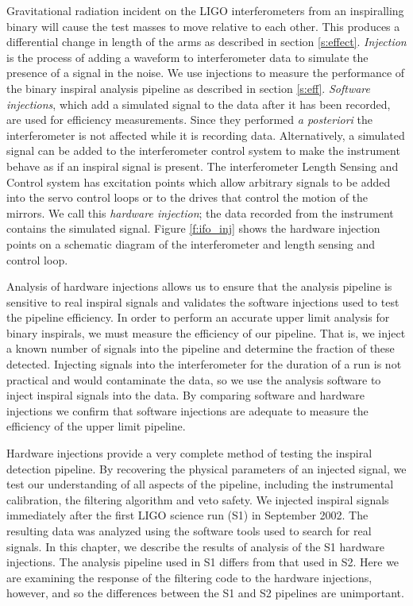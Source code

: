 
Gravitational radiation incident on the LIGO interferometers from an
inspiralling binary will cause the test masses to move relative to each other.
This produces a differential change in length of the arms as described in
section \ref{s:effect}.  \emph{Injection} is the process of adding a waveform to
interferometer data to simulate the presence of a signal in the noise. We use
injections to measure the performance of the binary inspiral analysis
pipeline as described in section \ref{s:eff}.  \emph{Software injections},
which add a simulated signal to the data after it has been recorded, are used
for efficiency measurements. Since they performed \emph{a posteriori} the
interferometer is not affected while it is recording data.  Alternatively, a
simulated signal can be added to the interferometer control system to make the
instrument behave as if an inspiral signal is present.  The interferometer
Length Sensing and Control system has excitation points which allow arbitrary
signals to be added into the servo control loops or to the drives that control
the motion of the mirrors\cite{LIGOS1instpaper}.  We call this \emph{hardware
injection}; the data recorded from the instrument contains the simulated
signal. Figure \ref{f:ifo_inj} shows the hardware injection points on a
schematic diagram of the interferometer and length sensing and control loop.

Analysis of hardware injections allows us to ensure that the analysis pipeline
is sensitive to real inspiral signals and validates the software injections
used to test the pipeline efficiency.  In order to perform an accurate upper
limit analysis for binary inspirals, we must measure the efficiency of our
pipeline. That is, we inject a known number of signals into the pipeline and
determine the fraction of these detected.  Injecting signals into the
interferometer for the duration of a run is not practical and would
contaminate the data, so we use the analysis software to inject inspiral
signals into the data.  By comparing software and hardware injections we
confirm that software injections are adequate to measure the efficiency of the
upper limit pipeline.

Hardware injections provide a very complete method of testing the inspiral
detection pipeline. By recovering the physical parameters of an injected
signal, we test our understanding of all aspects of the pipeline, including
the instrumental calibration, the filtering algorithm and veto safety. We
injected inspiral signals immediately after the first LIGO science run (S1) in
September 2002. The resulting data was analyzed using the
software tools used to search for real signals.  In this chapter, we describe
the results of analysis of the S1 hardware injections. The analysis pipeline
used in S1 differs from that used in S2\cite{LIGOS1iul}. Here we are examining
the response of the filtering code to the hardware injections, however, and so
the differences between the S1 and S2 pipelines are unimportant.

